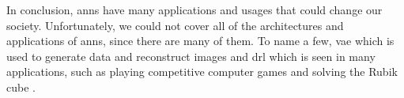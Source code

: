 \documentclass[runningheads]{llncs}
\begin{document}
In conclusion, \gls{anns} have many applications and usages that 
could change our society.
Unfortunately, we could not cover all of the architectures and applications of \gls{anns},
since there are many of them. To name a few, \gls{vae} which is used to generate data and 
reconstruct images \cite{hou2017deep} \cite{yan2016attribute2image} and 
 \gls{drl} which is seen in many applications, such as playing competitive computer games \cite{berner2019dota} and solving the Rubik cube \cite{openairubikcube}.


















%
%
%


%





\end{document}
